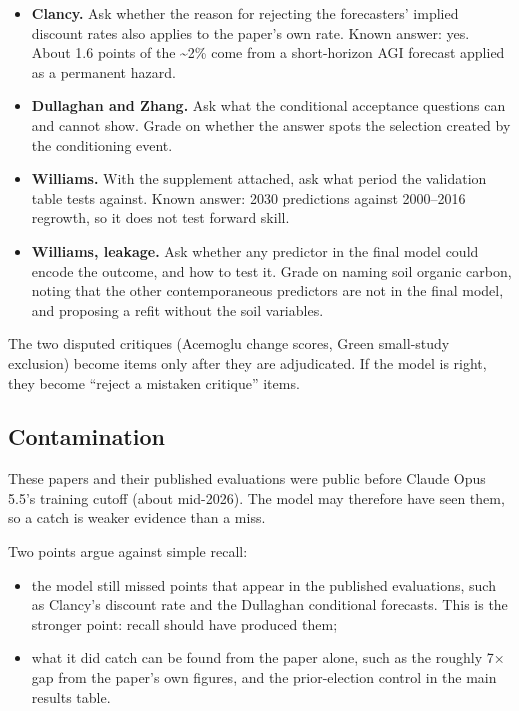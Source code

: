 \documentclass[
  11pt,
  letterpaper,
]{article}
\providecommand{\tightlist}{%
  \setlength{\itemsep}{0pt}\setlength{\parskip}{0pt}}
\begin{document}
\begin{itemize}
\tightlist
\item
  \textbf{Clancy.} Ask whether the reason for rejecting the forecasters'
  implied discount rates also applies to the paper's own rate. Known
  answer: yes. About 1.6 points of the \textasciitilde2\% come from a
  short-horizon AGI forecast applied as a permanent hazard.
\item
  \textbf{Dullaghan and Zhang.} Ask what the conditional acceptance
  questions can and cannot show. Grade on whether the answer spots the
  selection created by the conditioning event.
\item
  \textbf{Williams.} With the supplement attached, ask what period the
  validation table tests against. Known answer: 2030 predictions against
  2000--2016 regrowth, so it does not test forward skill.
\item
  \textbf{Williams, leakage.} Ask whether any predictor in the final
  model could encode the outcome, and how to test it. Grade on naming
  soil organic carbon, noting that the other contemporaneous predictors
  are not in the final model, and proposing a refit without the soil
  variables.
\end{itemize}

The two disputed critiques (Acemoglu change scores, Green small-study
exclusion) become items only after they are adjudicated. If the model is
right, they become ``reject a mistaken critique'' items.

\subsection{Contamination}\label{contamination}

These papers and their published evaluations were public before Claude
Opus 5.5's training cutoff (about mid-2026). The model may therefore
have seen them, so a catch is weaker evidence than a miss.

Two points argue against simple recall:

\begin{itemize}
\tightlist
\item
  the model still missed points that appear in the published
  evaluations, such as Clancy's discount rate and the Dullaghan
  conditional forecasts. This is the stronger point: recall should have
  produced them;
\item
  what it did catch can be found from the paper alone, such as the
  roughly 7× gap from the paper's own figures, and the prior-election
  control in the main results table.
\end{itemize}
\end{document}
